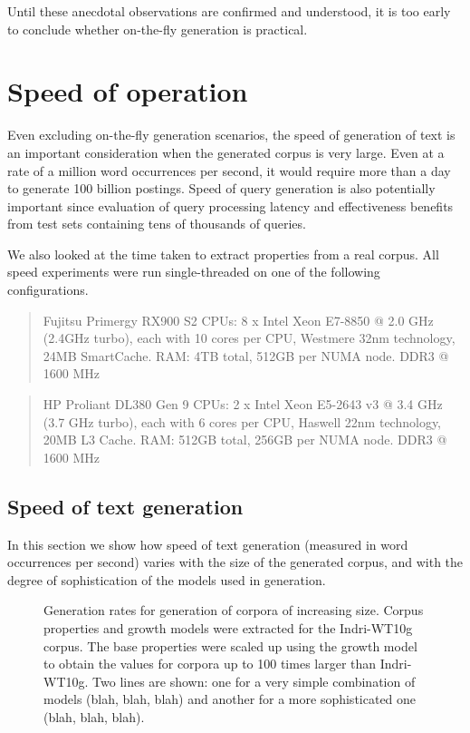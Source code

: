 \documentclass[11pt]{report}
\newcommand{\IndriWT}{Indri-WT10g}
\begin{document}
Until these anecdotal observations are confirmed and understood, it 
is too early to conclude 
whether on-the-fly generation is practical.




\chapter{Speed of operation}   %
\label{chap:speed}
Even excluding on-the-fly generation scenarios, the speed of
generation of text is an important consideration when the generated
corpus is very large.  Even at a rate of a million word occurrences per
second, it would require more than a day to generate 100 billion
postings.  Speed of query generation is also potentially important
since evaluation of query processing latency and effectiveness
benefits from test sets containing tens of thousands of queries.

We also looked at the time taken to extract properties from a real
corpus.  All speed experiments were run single-threaded on one of the
following configurations.

\begin{quote}
  Fujitsu Primergy RX900 S2
  CPUs: 8 x Intel Xeon E7-8850 @ 2.0 GHz (2.4GHz turbo), each with 10 cores per
  CPU, Westmere 32nm technology,  24MB SmartCache.
  RAM: 4TB total, 512GB per NUMA node.   DDR3 @ 1600 MHz

\end{quote}

\begin{quote}
  HP Proliant DL380 Gen 9
  CPUs: 2 x Intel Xeon E5-2643 v3 @ 3.4 GHz (3.7 GHz turbo), each with 6 cores per
  CPU, Haswell 22nm technology,  20MB  L3 Cache.
  RAM: 512GB total, 256GB per NUMA node.   DDR3 @ 1600 MHz

\end{quote}



\section{Speed of text generation}
In this section we show how speed of text generation (measured in word
occurrences per second) varies with the size of the generated corpus,
and with the degree of sophistication of the models used in
generation.

\begin{figure}[htb]
\centering
\caption{Generation rates for generation of corpora of increasing size.
Corpus properties and growth models were extracted for the \IndriWT
corpus.  The base properties were scaled up using the growth model to
obtain the values for corpora up to 100 times larger than \IndriWT.
Two lines are shown: one for a very simple combination of models
(blah, blah, blah) and
another for a more sophisticated one (blah, blah, blah).  }
\label{fig:TextGenSpeed}
\end{figure}
\end{document}
